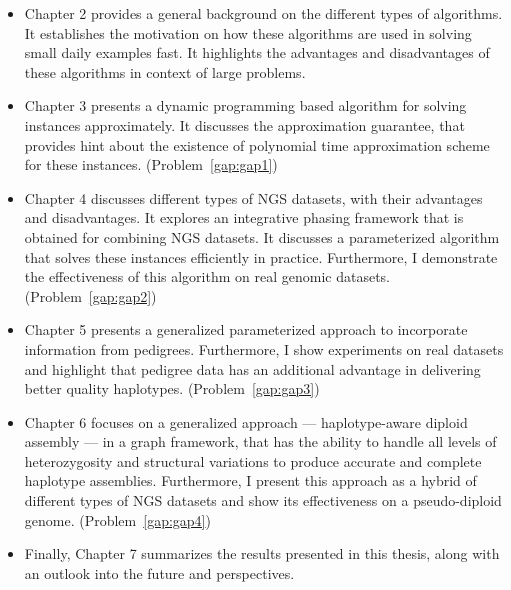 \begin{itemize}
 \item Chapter 2 provides a general background on the different types of algorithms. 
 It establishes the motivation on how these algorithms are used in solving small daily examples fast. 
 It highlights the advantages and disadvantages of these algorithms in context of large problems.
 \item Chapter 3 presents a dynamic programming based algorithm for solving \GMEC instances approximately.
 It discusses the approximation guarantee, that provides hint about the existence of polynomial time approximation scheme for these instances. (Problem~\ref{gap:gap1})
  \item Chapter 4 discusses different types of NGS datasets, with their advantages and disadvantages. 
  It explores an integrative phasing framework that is obtained for combining NGS datasets. 
  It discusses a parameterized algorithm that solves these instances efficiently in practice. 
  Furthermore, I demonstrate the effectiveness of this algorithm on real genomic datasets. (Problem~\ref{gap:gap2})

 \item Chapter 5 presents a generalized parameterized approach to incorporate information from pedigrees. 
Furthermore, I show experiments on real datasets and highlight that pedigree data has an additional advantage in delivering better quality haplotypes. (Problem~\ref{gap:gap3})
  \item Chapter 6 focuses on a generalized approach --- haplotype-aware diploid assembly --- in a graph framework, that has the ability to handle all levels of heterozygosity and structural variations to produce accurate and complete haplotype assemblies.
 Furthermore, I present this approach as a hybrid of different types of NGS datasets and show its effectiveness on a pseudo-diploid genome. (Problem~\ref{gap:gap4})

 \item Finally, Chapter 7 summarizes the results presented in this thesis, along with an outlook into the future and perspectives.
\end{itemize}

